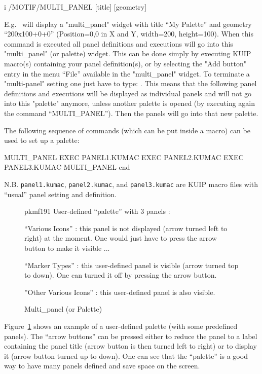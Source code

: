 \begin{Gray}{i}
 /MOTIF/MULTI_PANEL [title] [geometry]
\end{Gray}
E.g.\  will display a
"multi_panel" widget with title ``My Palette'' and geometry
``200x100+0+0'' (Position=0,0 in X and Y, width=200, height=100).
When this command is executed all panel definitions and executions will go
into this "multi_panel" (or palette) widget. This can be done simply by
executing KUIP macro(s) containing your panel definition(s), or
by selecting the "Add button" entry in the menu ``File'' available
in the "multi_panel" widget.
To terminate a "multi-panel" setting one just have to type:
. This means that the following panel definitions
and executions will be displayed as individual panels and will not go into
this "palette" anymore, unless another palette is opened (by executing again
the command ``MULTI_PANEL''). Then the panels will go
into that new palette.
 
The following sequence of commands (which can be put inside a macro)
can be used to set up a palette:
\begin{XMP}
   MULTI_PANEL
   EXEC PANEL1.KUMAC
   EXEC PANEL2.KUMAC
   EXEC PANEL3.KUMAC
   MULTI_PANEL end
\end{XMP}
N.B. \texttt{panel1.kumac}, \texttt{panel2.kumac}, and
\texttt{panel3.kumac} are KUIP macro files with ``usual'' panel
setting and definition. 
 
\begin{figure}[htb]
\begin{PICTf}[.4]{pkmf191}
User-defined \KUIPMotif{} ``palette'' with 3 panels :
\begin{DLsf}{}
\item ``Various Icons'' : this panel is not displayed (arrow turned left
to right) at the moment. One would just have to press the arrow button
to make it visible ...
\item ``Marker Types'' : this user-defined panel is visible (arrow turned
top to down). One can turned it off by pressing the arrow button.
\item ''Other Various Icons'' : this user-defined panel is also visible.
\end{DLsf}
\end{PICTf}
\caption{Multi_panel (or Palette)}
\label{ref:FIGPKMF191}
\end{figure}

Figure~\ref{ref:FIGPKMF191} shows an example of a user-defined
palette (with some predefined panels). The ``arrow buttons'' can be
pressed either to reduce the panel to a label containing the panel title
(arrow button is then turned left to right) or to display it (arrow button
turned up to down). One can see that the \KUIPMotif{} ``palette'' is a good way
to have many panels defined and save space on the screen.
 
